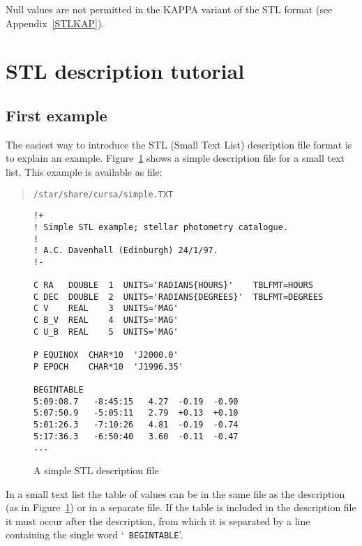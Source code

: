 \documentclass[twoside,11pt]{article}
\newcommand{\xlabel}[1]{}
\renewcommand{\_}{\texttt{\symbol{95}}}
\begin{document}
Null values are not permitted in the KAPPA variant of the STL format
(see Appendix~\ref{STLKAP}).


\section{\xlabel{STLTUT}\label{STLTUT}STL description tutorial}

\subsection{First example}

The easiest way to introduce the STL (Small Text List) description file
format is to explain an example.  Figure~\ref{DESCR_SIMPLE} shows a simple
description file for a small text list.  This example is available as
file:

\begin{verse}
{\tt /star/share/cursa/simple.TXT}
\end{verse}

\begin{figure}[htbp]


\begin{verbatim}
!+
! Simple STL example; stellar photometry catalogue.
!
! A.C. Davenhall (Edinburgh) 24/1/97.
!-

C RA   DOUBLE  1  UNITS='RADIANS{HOURS}'    TBLFMT=HOURS
C DEC  DOUBLE  2  UNITS='RADIANS{DEGREES}'  TBLFMT=DEGREES
C V    REAL    3  UNITS='MAG'
C B_V  REAL    4  UNITS='MAG'
C U_B  REAL    5  UNITS='MAG'

P EQUINOX  CHAR*10  'J2000.0'
P EPOCH    CHAR*10  'J1996.35'

BEGINTABLE
5:09:08.7   -8:45:15   4.27  -0.19  -0.90
5:07:50.9   -5:05:11   2.79  +0.13  +0.10
5:01:26.3   -7:10:26   4.81  -0.19  -0.74
5:17:36.3   -6:50:40   3.60  -0.11  -0.47
...
\end{verbatim}

\caption{A simple STL description file\label{DESCR_SIMPLE} }

\end{figure}

In a small text list the table of values can be in the same
file as the description (as in Figure~\ref{DESCR_SIMPLE}) or in a
separate file.
If the table is
included in the description file it must occur after the description,
from which it is separated by a line containing the single word `{\tt
BEGINTABLE}'.
\end{document}
